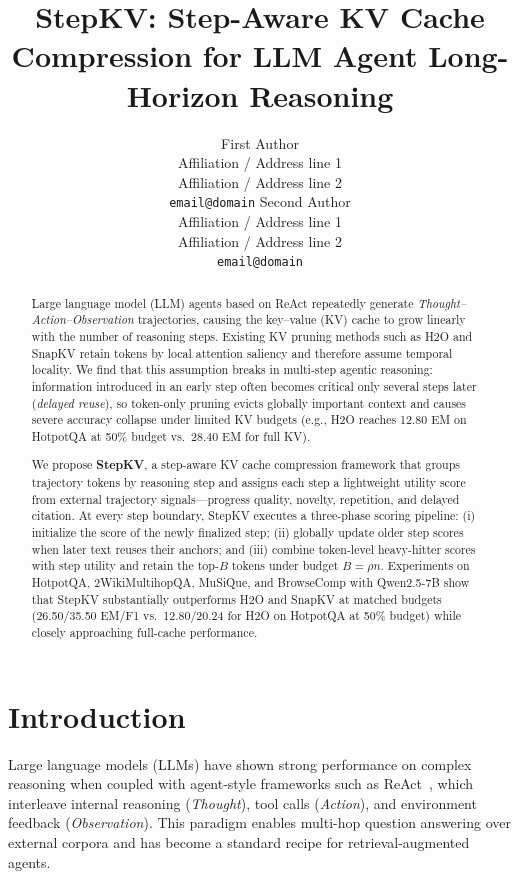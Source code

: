 \documentclass[11pt]{article}
\title{StepKV: Step-Aware KV Cache Compression for LLM Agent Long-Horizon Reasoning}
\author{
First Author \\
Affiliation / Address line 1 \\
Affiliation / Address line 2 \\
\texttt{email@domain}
\And
Second Author \\
Affiliation / Address line 1 \\
Affiliation / Address line 2 \\
\texttt{email@domain}
}
\begin{document}
\maketitle

\begin{abstract}
Large language model (LLM) agents based on ReAct repeatedly generate \textit{Thought--Action--Observation} trajectories, causing the key--value (KV) cache to grow linearly with the number of reasoning steps.
Existing KV pruning methods such as H2O and SnapKV retain tokens by local attention saliency and therefore assume temporal locality.
We find that this assumption breaks in multi-step agentic reasoning: information introduced in an early step often becomes critical only several steps later (\emph{delayed reuse}), so token-only pruning evicts globally important context and causes severe accuracy collapse under limited KV budgets (e.g., H2O reaches 12.80 EM on HotpotQA at 50\% budget vs.\ 28.40 EM for full KV).

We propose \textbf{StepKV}, a step-aware KV cache compression framework that groups trajectory tokens by reasoning step and assigns each step a lightweight utility score from external trajectory signals---progress quality, novelty, repetition, and delayed citation.
At every step boundary, StepKV executes a three-phase scoring pipeline: (i) initialize the score of the newly finalized step; (ii) globally update older step scores when later text reuses their anchors; and (iii) combine token-level heavy-hitter scores with step utility and retain the top-$B$ tokens under budget $B=\rho n$.
Experiments on HotpotQA, 2WikiMultihopQA, MuSiQue, and BrowseComp with Qwen2.5-7B show that StepKV substantially outperforms H2O and SnapKV at matched budgets (26.50/35.50 EM/F1 vs.\ 12.80/20.24 for H2O on HotpotQA at 50\% budget) while closely approaching full-cache performance.
\end{abstract}

\section{Introduction}

Large language models (LLMs) have shown strong performance on complex reasoning when coupled with agent-style frameworks such as ReAct~\cite{yao2023react}, which interleave internal reasoning (\textit{Thought}), tool calls (\textit{Action}), and environment feedback (\textit{Observation}).
This paradigm enables multi-hop question answering over external corpora and has become a standard recipe for retrieval-augmented agents.
\end{document}
